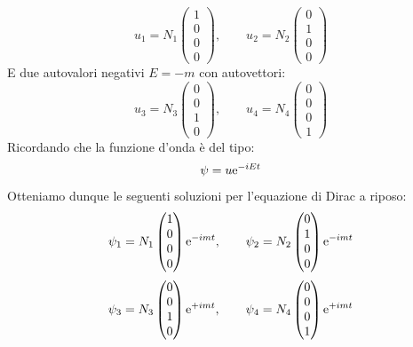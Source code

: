 \begin{equation}
    u_1 = N_1 \begin{pmatrix}
      1 \\ 0 \\ 0 \\ 0
    \end{pmatrix}, \qquad
    u_2 = N_2 \begin{pmatrix}
      0 \\ 1 \\ 0 \\ 0
    \end{pmatrix}
\end{equation}
E due autovalori negativi $E = -m$ con autovettori:
\begin{equation}
    u_3 = N_3 \begin{pmatrix}
      0 \\ 0 \\ 1 \\ 0
    \end{pmatrix}, \qquad
    u_4 = N_4 \begin{pmatrix}
      0 \\ 0 \\ 0 \\ 1
    \end{pmatrix}
\end{equation}
Ricordando che la funzione d'onda è del tipo:
\begin{equation}
  \psi = u \mathrm{e}^{-iEt}
\end{equation}
Otteniamo dunque le seguenti soluzioni per l'equazione di Dirac a riposo:
\begin{equation}
    \psi_1 = N_1 \begin{pmatrix}
      1 \\ 0 \\ 0 \\ 0
    \end{pmatrix} \mathrm{e}^{-imt}, \qquad
    \psi_2 = N_2 \begin{pmatrix}
      0 \\ 1 \\ 0 \\ 0
    \end{pmatrix} \mathrm{e}^{-imt}
\end{equation}
\begin{equation}
    \psi_3 = N_3 \begin{pmatrix}
      0 \\ 0 \\ 1 \\ 0
    \end{pmatrix} \mathrm{e}^{+imt}, \qquad
    \psi_4 = N_4 \begin{pmatrix}
      0 \\ 0 \\ 0 \\ 1
    \end{pmatrix} \mathrm{e}^{+imt}
\end{equation}
